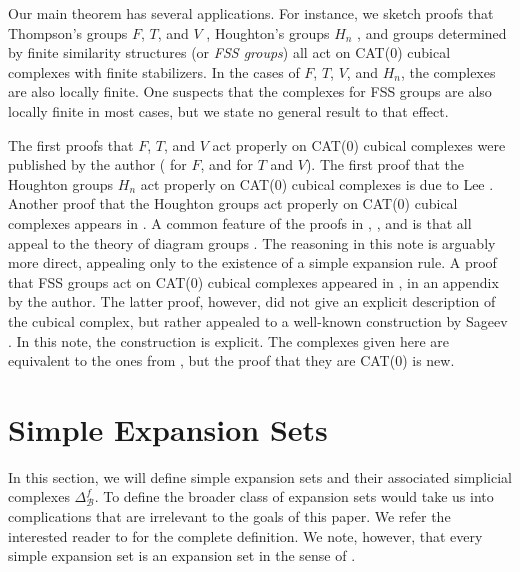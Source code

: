 \documentclass{amsart}
\newtheorem{standing assumption}[theorem]{Standing Assumption}
\begin{document}
Our main theorem has several applications. For instance, we sketch  proofs that Thompson's groups $F$, $T$, and $V$ \cite{CFP}, Houghton's groups $H_{n}$ \cite{Houghton}, and groups determined by finite similarity structures \cite{Hughes} (or \emph{FSS groups}) all act on CAT(0) cubical complexes with finite stabilizers. In the cases of $F$, $T$, $V$, and $H_{n}$, the complexes are also locally finite. One suspects that the complexes for FSS groups are also locally finite in most cases, but we state no general result to that effect.

The first proofs that $F$, $T$, and $V$ act properly on CAT(0) cubical complexes were published by the author (\cite{MyThesis} for $F$, and \cite{Morethesis} for $T$ and $V$). The first proof that the Houghton groups $H_{n}$ act properly on CAT(0) cubical complexes is due to Lee \cite{Lee}. Another proof that the Houghton groups act properly on CAT(0) cubical complexes appears in \cite{FHBraided}. A common feature of the proofs in \cite{MyThesis}, \cite{Morethesis}, and \cite{FHBraided} is that all appeal to the theory of diagram groups \cite{GubaSapir}. The reasoning in this note is arguably more direct, appealing only to the existence of a simple expansion rule. A proof that FSS groups act on CAT(0) cubical complexes appeared in \cite{Hughes}, in an appendix by the author. The latter proof, however, did not give an explicit description of the cubical complex, but rather appealed to a well-known construction
by Sageev \cite{Sageev}. In this note, the construction is explicit. The complexes given here are equivalent to the ones from \cite{FH2}, but the proof that they are CAT(0) is new.

 




\section{Simple Expansion Sets}

In this section, we will define simple expansion sets and their associated simplicial complexes $\Delta^{f}_{\mathcal{B}}$. To define the broader class of expansion sets would take us into complications that are irrelevant to the goals of this paper. We refer the interested reader to \cite{Farley} for the complete definition. We note, however, that every simple expansion set is an expansion set in the sense of \cite{Farley}. 
\end{document}
